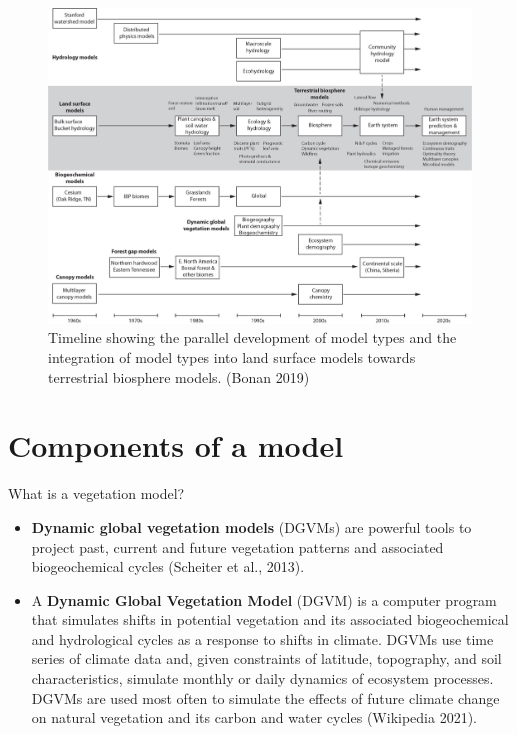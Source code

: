 \documentclass[12pt,oneside]{book}
\providecommand{\tightlist}{%
  \setlength{\itemsep}{0pt}\setlength{\parskip}{0pt}}
\begin{document}
\begin{figure}

{\centering \includegraphics[width=0.8\linewidth]{figures/chap1/timeline} 

}

\caption{Timeline showing the parallel development of model types and the integration of model types into land surface models towards terrestrial biosphere models. (Bonan 2019)}\label{fig:f7}
\end{figure}

\section{Components of a model}\label{components-of-a-model}

What is a vegetation model?

\begin{itemize}
\tightlist
\item
  \textbf{Dynamic global vegetation models} (DGVMs) are powerful tools
  to project past, current and future vegetation patterns and associated
  biogeochemical cycles (Scheiter et al., 2013).
\item
  A \textbf{Dynamic Global Vegetation Model} (DGVM) is a computer
  program that simulates shifts in potential vegetation and its
  associated biogeochemical and hydrological cycles as a response to
  shifts in climate. DGVMs use time series of climate data and, given
  constraints of latitude, topography, and soil characteristics,
  simulate monthly or daily dynamics of ecosystem processes. DGVMs are
  used most often to simulate the effects of future climate change on
  natural vegetation and its carbon and water cycles (Wikipedia 2021).
\end{itemize}
\end{document}
